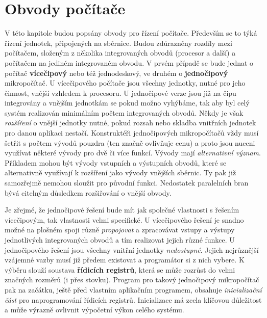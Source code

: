   \section{Obvody počítače}\label{ces:IchapIVsecIII}
    V této kapitole budou popsány obvody pro řízení počítače. Především se to týká řízení jednotek, 
    připojených na sběrnice. Budou zdůrazněny rozdíly mezi počítačem, složeným z několika 
    integrovaných obvodů (procesor a další) a počítačem na jediném integrovaném obvodu. V prvém 
    případě se bude jednat o počítač \textbf{vícečipový} nebo též jednodeskový, ve druhém o 
    \textbf{jednočipový} mikropočítač. U vícečipového počítače jsou všechny jednotky, nutné pro 
    jeho činnost, vnější vzhledem k procesoru. U jednočipové verze jsou již na čipu integrovány a 
    vnějším jednotkám se pokud možno vyhýbáme, tak aby byl celý systém realizován minimálním počtem 
    integrovaných obvodů. Někdy je však \emph{rozšíření} o vnější jednotky nutné, pokud rozsah nebo 
    skladba vnitřních jednotek pro danou aplikaci nestačí. Konstruktéři jednočipových mikropočítačů 
    vždy musí šetřit s počtem vývodů pouzdra (ten značně ovlivňuje cenu) a proto jsou nuceni 
    využívat některé vývody pro dvě či více funkcí. Vývody mají \emph{alternativní význam}. 
    Příkladem mohou být vývody vstupních a výstupních obvodů, které se alternativně využívají k 
    rozšíření jako vývody vnějších sběrnic. Ty pak již samozřejmě nemohou sloužit pro původní 
    funkci. Nedostatek paralelních bran bývá citelným důsledkem rozšiřování o vnější obvody.
    
    Je zřejmé, že jednočipové řešení bude mít jak společné vlastnosti s řešením vícečipovým, tak 
    vlastnosti velmi specifické. U vícečipového řešení je snadno možné na plošném spoji různě 
    \emph{propojovat} a zpracovávat vstupy a výstupy jednotlivých integrovaných obvodů a tím 
    realizovat jejich různé funkce. U jednočipového řešení jsou všechny vnitřní jednotky 
    \emph{nedostupné}. Jejich nejrůznější vzájemné vazby musí již předem existovat a programátor si 
    z nich vybere. K výběru slouží soustava \textbf{řídicích registrů}, která se může rozrůst do 
    velmi značných rozměrů (i přes stovku). Program pro takový jednočipový mikropočítač pak na 
    začátku, ještě před vlastním aplikačním programem, obsahuje \emph{inicializační část} pro 
    naprogramování řídicích registrů. Inicializace má zcela klíčovou důležitost a může výrazně 
    ovlivnit výpočetní výkon celého systému.
    

